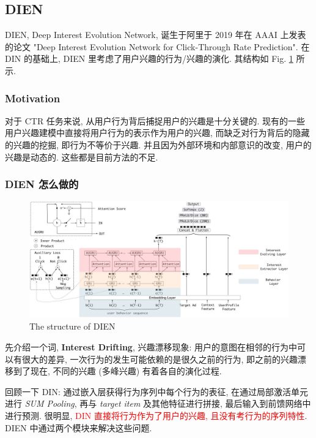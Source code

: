 \subsection{DIEN}
DIEN, Deep Interest Evolution Network, 诞生于阿里于 2019 年在 AAAI 上发表的论文 "Deep Interest Evolution Network for Click-Through Rate Prediction". 在 DIN 的基础上, DIEN 里考虑了用户兴趣的行为/兴趣的演化. 其结构如 Fig. \ref{fig:dien} 所示.

\subsubsection{Motivation}
对于 CTR 任务来说, 从用户行为背后捕捉用户的兴趣是十分关键的. 现有的一些用户兴趣建模中直接将用户行为的表示作为用户的兴趣, 而缺乏对行为背后的隐藏的兴趣的挖掘, 即行为不等价于兴趣. 并且因为外部环境和内部意识的改变, 用户的兴趣是动态的. 这些都是目前方法的不足.

\subsubsection{DIEN 怎么做的}
\begin{figure}[h]
	\centering
	\includegraphics[width=\textwidth]{pics/dien.jpg}
	\caption{The structure of DIEN}
	\label{fig:dien}
\end{figure}

先介绍一个词, \textbf{Interest Drifting}, 兴趣漂移现象: 用户的意图在相邻的行为中可以有很大的差异, 一次行为的发生可能依赖的是很久之前的行为, 即之前的兴趣漂移到了现在, 不同的兴趣 (多峰兴趣) 有着各自的演化过程.

回顾一下 DIN: 通过嵌入层获得行为序列中每个行为的表征, 在通过局部激活单元进行 \textit{SUM Pooling}, 再与 \textit{target item} 及其他特征进行拼接, 最后输入到前馈网络中进行预测. 很明显, \textcolor{red}{DIN 直接将行为作为了用户的兴趣, 且没有考行为的序列特性}. DIEN 中通过两个模块来解决这些问题.

